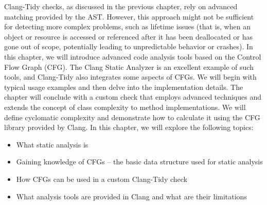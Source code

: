 
Clang-Tidy checks, as discussed in the previous chapter, rely on advanced matching provided by the AST. However, this approach might not be sufficient for detecting more complex problems, such as lifetime issues (that is, when an object or resource is accessed or referenced after it has been deallocated or has gone out of scope, potentially leading to unpredictable behavior or crashes). In this chapter, we will introduce advanced code analysis tools based on the Control Flow Graph (CFG). The Clang Static Analyzer is an excellent example of such tools, and Clang-Tidy also integrates some aspects of CFGs. We will begin with typical usage examples and then delve into the implementation details. The chapter will conclude with a custom check that employs advanced techniques and extends the concept of class complexity to method implementations. We will define cyclomatic complexity and demonstrate how to calculate it using the CFG library provided by Clang. In this chapter, we will explore the following topics:

\begin{itemize}
\item
What static analysis is

\item
Gaining knowledge of CFGs – the basic data structure used for static analysis

\item
How CFGs can be used in a custom Clang-Tidy check

\item
What analysis tools are provided in Clang and what are their limitations
\end{itemize}